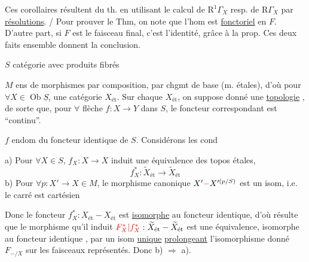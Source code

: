 Ces corollaires résultent du th. en utilisant le calcul de $\mathrm R^1\Gamma_X$ resp. de $\mathrm R\Gamma_X$ par \uline{résolutions}. / Pour prouver le Thm, on note que   l'hom
est \uline{fonctoriel} en $F$. D'autre part, si $F$ est le faisceau final, c'est l'identité, grâce à la prop. Ces deux faits ensemble donnent  la conclusion.

$S$ catégorie avec produits fibrés

$M$ ens de morphismes  par composition, par chgmt de base (m.  étales), d'où pour $\forall X\in\operatorname{Ob}\underline S$, une catégorie $X_{\text{ét}}$.
Sur chaque $X_{\text{ét}}$, on suppose donné une \uline{topologie} , de sorte que,  pour $\forall$ flèche $f:X\to Y$ dans $S$, le foncteur correspondant
est ``continu''.

$f$ endom du foncteur identique de $S$. Considérons  les cond

a) Pour $\forall X\in S$, $f_X:X\to X$ induit une équivalence des topos étales,
\[
f_X^*:\widetilde X_{\text{ét}}\longrightarrow\widetilde X_{\text{ét}}
\]
b) Pour $\forall p:X'\to X\in M$, le morphisme canonique $X'{\color{red}\mathbin{-}}X'^{(p/S)}$ est un isom, i.e. le carré
est cartésien

Donc  le foncteur $f_X^*:X_{\text{ét}}\mathbin{-}X_{\text{ét}}$ est \uline{isomorphe} au foncteur identique, d'où résulte que le morphisme  qu'il induit ${\color{red}F_X^*|f_X^*}:\widetilde X_{\text{ét}}\mathbin{-}\widetilde X_{\text{ét}}$ est une équivalence, isomorphe au foncteur identique , par un isom \uline{unique} \uline{prolongeant} l'isomorphisme donné $F_{-/X}$ sur les faisceaux représentés. Donc b) $\Rightarrow$ a).

